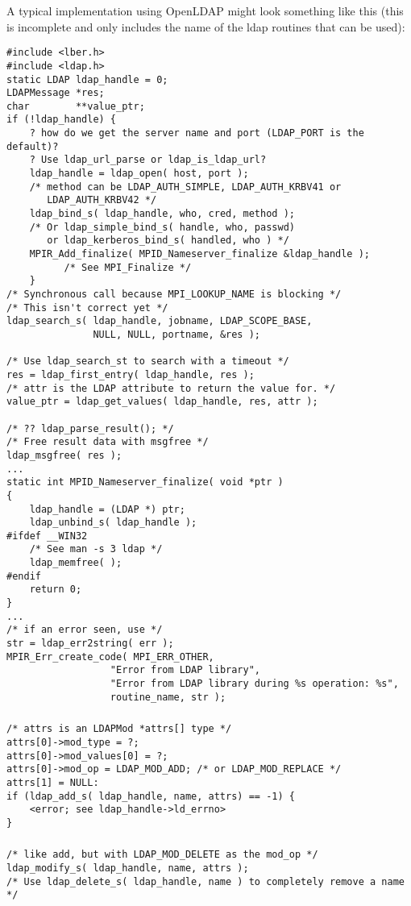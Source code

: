 \documentclass{article}
\begin{document}
A typical implementation using OpenLDAP might look something like
this (this is incomplete and only includes the name of the ldap
routines that can be used):
\begin{verbatim}
#include <lber.h>
#include <ldap.h>
static LDAP ldap_handle = 0;
LDAPMessage *res;
char        **value_ptr;
if (!ldap_handle) {
    ? how do we get the server name and port (LDAP_PORT is the default)?
    ? Use ldap_url_parse or ldap_is_ldap_url?
    ldap_handle = ldap_open( host, port );
    /* method can be LDAP_AUTH_SIMPLE, LDAP_AUTH_KRBV41 or 
       LDAP_AUTH_KRBV42 */
    ldap_bind_s( ldap_handle, who, cred, method );
    /* Or ldap_simple_bind_s( handle, who, passwd) 
       or ldap_kerberos_bind_s( handled, who ) */
    MPIR_Add_finalize( MPID_Nameserver_finalize &ldap_handle );  
          /* See MPI_Finalize */
    }
/* Synchronous call because MPI_LOOKUP_NAME is blocking */
/* This isn't correct yet */
ldap_search_s( ldap_handle, jobname, LDAP_SCOPE_BASE, 
               NULL, NULL, portname, &res );

/* Use ldap_search_st to search with a timeout */
res = ldap_first_entry( ldap_handle, res );
/* attr is the LDAP attribute to return the value for. */
value_ptr = ldap_get_values( ldap_handle, res, attr );

/* ?? ldap_parse_result(); */
/* Free result data with msgfree */
ldap_msgfree( res );
...
static int MPID_Nameserver_finalize( void *ptr )
{
    ldap_handle = (LDAP *) ptr;
    ldap_unbind_s( ldap_handle );
#ifdef __WIN32
    /* See man -s 3 ldap */
    ldap_memfree( );
#endif
    return 0;
}
...
/* if an error seen, use */
str = ldap_err2string( err );
MPIR_Err_create_code( MPI_ERR_OTHER, 
                  "Error from LDAP library",
                  "Error from LDAP library during %s operation: %s", 
                  routine_name, str );
\end{verbatim}

\subsubsection{}
\begin{verbatim}
/* attrs is an LDAPMod *attrs[] type */
attrs[0]->mod_type = ?;
attrs[0]->mod_values[0] = ?;
attrs[0]->mod_op = LDAP_MOD_ADD; /* or LDAP_MOD_REPLACE */
attrs[1] = NULL:
if (ldap_add_s( ldap_handle, name, attrs) == -1) {
    <error; see ldap_handle->ld_errno>
}
\end{verbatim}

\subsubsection{}
\begin{verbatim}
/* like add, but with LDAP_MOD_DELETE as the mod_op */
ldap_modify_s( ldap_handle, name, attrs );
/* Use ldap_delete_s( ldap_handle, name ) to completely remove a name */
\end{verbatim}
\end{document}
